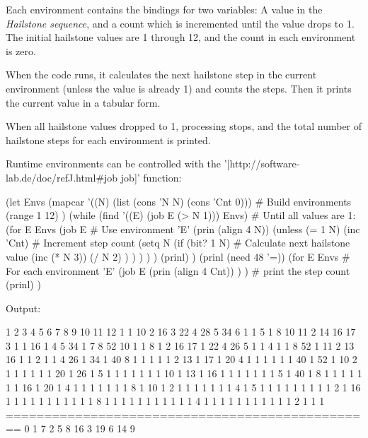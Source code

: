 Each environment contains the bindings for two variables: A value in
the \emph{Hailstone sequence}, and a count which is incremented until
the value drops to 1. The initial hailstone values are 1 through 12,
and the count in each environment is zero.

When the code runs, it calculates the next hailstone step in the current
environment (unless the value is already 1) and counts the steps. Then
it prints the current value in a tabular form.

When all hailstone values dropped to 1, processing stops, and the total
number of hailstone steps for each environment is printed.

\begin{wideverbatim}

Runtime environments can be controlled with the
'[http://software-lab.de/doc/refJ.html#job job]' function:

(let Envs
   (mapcar
      '((N) (list (cons 'N N) (cons 'Cnt 0)))  # Build environments
      (range 1 12) )
   (while (find '((E) (job E (> N 1))) Envs)   # Until all values are 1:
      (for E Envs
         (job E                                # Use environment 'E'
            (prin (align 4 N))
            (unless (= 1 N)
               (inc 'Cnt)                      # Increment step count
               (setq N
                  (if (bit? 1 N)               # Calculate next hailstone value
                     (inc (* N 3))
                     (/ N 2) ) ) ) ) )
      (prinl) )
   (prinl (need 48 '=))
   (for E Envs                                 # For each environment 'E'
      (job E
         (prin (align 4 Cnt)) ) )              # print the step count
   (prinl) )


Output:

   1   2   3   4   5   6   7   8   9  10  11  12
   1   1  10   2  16   3  22   4  28   5  34   6
   1   1   5   1   8  10  11   2  14  16  17   3
   1   1  16   1   4   5  34   1   7   8  52  10
   1   1   8   1   2  16  17   1  22   4  26   5
   1   1   4   1   1   8  52   1  11   2  13  16
   1   1   2   1   1   4  26   1  34   1  40   8
   1   1   1   1   1   2  13   1  17   1  20   4
   1   1   1   1   1   1  40   1  52   1  10   2
   1   1   1   1   1   1  20   1  26   1   5   1
   1   1   1   1   1   1  10   1  13   1  16   1
   1   1   1   1   1   1   5   1  40   1   8   1
   1   1   1   1   1   1  16   1  20   1   4   1
   1   1   1   1   1   1   8   1  10   1   2   1
   1   1   1   1   1   1   4   1   5   1   1   1
   1   1   1   1   1   1   2   1  16   1   1   1
   1   1   1   1   1   1   1   1   8   1   1   1
   1   1   1   1   1   1   1   1   4   1   1   1
   1   1   1   1   1   1   1   1   2   1   1   1
================================================
   0   1   7   2   5   8  16   3  19   6  14   9

\end{wideverbatim}

